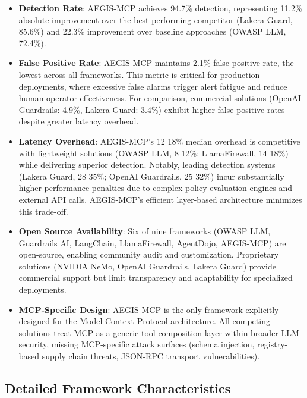 \documentclass[12pt,twocolumn,journal]{IEEEtran}
\begin{document}
\begin{itemize}
\item \textbf{Detection Rate}: AEGIS-MCP achieves 94.7\% detection, representing 11.2\% absolute improvement over the best-performing competitor (Lakera Guard, 85.6\%) and 22.3\% improvement over baseline approaches (OWASP LLM, 72.4\%).

\item \textbf{False Positive Rate}: AEGIS-MCP maintains 2.1\% false positive rate, the lowest across all frameworks. This metric is critical for production deployments, where excessive false alarms trigger alert fatigue and reduce human operator effectiveness. For comparison, commercial solutions (OpenAI Guardrails: 4.9\%, Lakera Guard: 3.4\%) exhibit higher false positive rates despite greater latency overhead.

\item \textbf{Latency Overhead}: AEGIS-MCP's 12 18\% median overhead is competitive with lightweight solutions (OWASP LLM, 8 12\%; LlamaFirewall, 14 18\%) while delivering superior detection. Notably, leading detection systems (Lakera Guard, 28 35\%; OpenAI Guardrails, 25 32\%) incur substantially higher performance penalties due to complex policy evaluation engines and external API calls. AEGIS-MCP's efficient layer-based architecture minimizes this trade-off.

\item \textbf{Open Source Availability}: Six of nine frameworks (OWASP LLM, Guardrails AI, LangChain, LlamaFirewall, AgentDojo, AEGIS-MCP) are open-source, enabling community audit and customization. Proprietary solutions (NVIDIA NeMo, OpenAI Guardrails, Lakera Guard) provide commercial support but limit transparency and adaptability for specialized deployments.

\item \textbf{MCP-Specific Design}: AEGIS-MCP is the only framework explicitly designed for the Model Context Protocol architecture. All competing solutions treat MCP as a generic tool composition layer within broader LLM security, missing MCP-specific attack surfaces (schema injection, registry-based supply chain threats, JSON-RPC transport vulnerabilities).
\end{itemize}

\subsection{Detailed Framework Characteristics}
\end{document}
